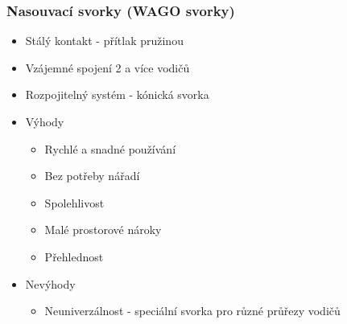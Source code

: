 \documentclass{article}
\begin{document}
\subsubsection{Nasouvací svorky (WAGO svorky)}
\begin{itemize}
  \item Stálý kontakt - přítlak pružinou
  \item Vzájemné spojení 2 a více vodičů
  \item Rozpojitelný systém - kónická svorka
  \item Výhody
  \begin{itemize}
    \item Rychlé a snadné používání
    \item Bez potřeby nářadí
    \item Spolehlivost
    \item Malé prostorové nároky
    \item Přehlednost 
  \end{itemize} 
  \item	Nevýhody
  \begin{itemize}
    \item Neuniverzálnost - speciální svorka pro různé průřezy vodičů
  \end{itemize}
\end{itemize}
\end{document}

